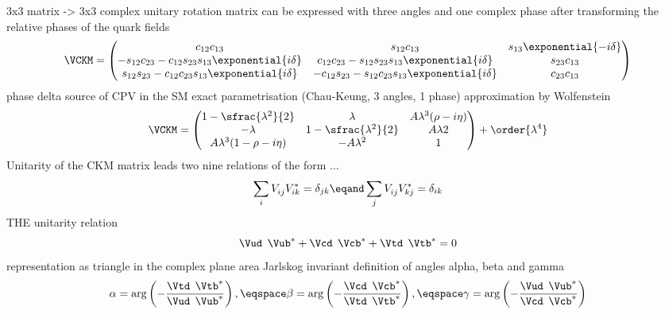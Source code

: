 %
3x3 matrix -> 
3x3 complex unitary rotation matrix
can be expressed with three angles and one complex phase after transforming the relative phases of the quark fields
%
\begin{equation}
  \VCKM = \begin{pmatrix}
    c_{12} c_{13}                                                   & s_{12} c_{13}                                                 & s_{13} \exponential{-i\delta} \\
    -s_{12} c_{23} - c_{12} s_{23} s_{13} \exponential{i\delta}     & c_{12} c_{23} - s_{12} s_{23} s_{13} \exponential{i\delta}    & s_{23} c_{13}                 \\
    s_{12} s_{23} - c_{12} c_{23} s_{13} \exponential{i\delta}      & -c_{12} s_{23} - s_{12} c_{23} s_{13} \exponential{i\delta}   & c_{23} c_{13}                 \\
  \end{pmatrix}
\end{equation}
%
phase delta source of CPV in the SM
exact parametrisation (Chau-Keung, 3 angles, 1 phase)
approximation by Wolfenstein
%
\begin{equation}  
  \VCKM = \begin{pmatrix}
    1 - \sfrac{\lambda^2}{2}        & \lambda                     & A \lambda^3 (\rho - i\eta)  \\
    -\lambda                        & 1 - \sfrac{\lambda^2}{2}    & A \lambda  2                \\
    A \lambda^3 (1 - \rho - i\eta)  & - A \lambda^2               & 1                           \\
  \end{pmatrix}
  + \order{\lambda^4}
\end{equation}
%
Unitarity of the CKM matrix leads two nine relations of the form ...
%
\begin{equation}
  \sum_i V_{ij}^{\phantom{\ast}} V_{ik}^{\ast} = \delta_{jk} \eqand
  \sum_j V_{ij}^{\phantom{\ast}} V_{kj}^{\ast} = \delta_{ik}
\end{equation}
%
THE unitarity relation
%
\begin{equation}
  \Vud^{\phantom{\ast}}\Vub^{\ast} + \Vcd^{\phantom{\ast}}\Vcb^{\ast} + \Vtd^{\phantom{\ast}}\Vtb^{\ast} = 0 
\end{equation}
%
representation as triangle in the complex plane
area Jarlskog invariant
definition of angles alpha, beta and gamma
%
\begin{equation}
  \alpha = \arg\left(-\frac{\Vtd^{\phantom{\ast}}\Vtb^{\ast}}{\Vud^{\phantom{\ast}}\Vub^{\ast}}\right),\eqspace 
  \beta =  \arg\left(-\frac{\Vcd^{\phantom{\ast}}\Vcb^{\ast}}{\Vtd^{\phantom{\ast}}\Vtb^{\ast}}\right),\eqspace 
  \gamma = \arg\left(-\frac{\Vud^{\phantom{\ast}}\Vub^{\ast}}{\Vcd^{\phantom{\ast}}\Vcb^{\ast}}\right)
\end{equation}
